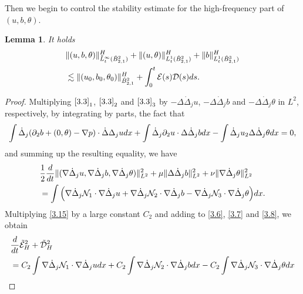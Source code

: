 \documentclass[10pt,a4paper]{amsart}
\numberwithin{equation}{section}
\newtheorem{lemma}[theorem]{Lemma}
\begin{document}
Then we begin to control the stability estimate for the high-frequency part of
$(u,b,\theta)$.

\begin{lemma}\label{lem3.2}
It holds
 \begin{equation}\label{3.14}
\begin{aligned}
&\|(u,b,\theta)\|_{\tilde{L}^\infty_t(\dot{B}^2_{2,1})}^H
 +\|(u,\theta)\|_{{L}^1_t(\dot{B}^2_{2,1})}^H+\|b\|_{{L}^1_t(\dot{B}^3_{2,1})}^H \\
&\lesssim\|(u_0,b_0,\theta_0)\|_{\dot{B}^2_{2,1}}^H
 +\int_0^t\mathcal{E}(s)\mathcal{D}(s){\rm d}s.
\end{aligned}
\end{equation}
\end{lemma}

\begin{proof}
Multiplying $\eqref{3.3}_1$, $\eqref{3.3}_2$ and $\eqref{3.3}_3$ by
$ -\Delta\dot{\Delta}_j u$, $ -\Delta\dot{\Delta}_j b$ and
$ -\Delta\dot{\Delta}_j \theta$ in $L^2$, respectively, by integrating by parts, the fact that
\[
 \int\dot{\Delta}_j(\partial_2b+(0,\theta)-\nabla p)\cdot\dot\Delta{\Delta}_j u{\rm d}x
 +\int\dot{\Delta}_j\partial_2u\cdot\Delta\dot{\Delta}_j b{\rm d}x
 -\int\dot{\Delta}_ju_2\Delta\dot{\Delta}_j\theta{\rm d}x=0,
\]
and summing up the resulting equality, we have
\begin{equation}\label{3.15}
\begin{aligned}
 &\frac{1}{2}\frac{\rm d}{{\rm d}t}\|(\nabla\dot{\Delta}_ju,\nabla\dot{\Delta}_jb,\nabla\dot{\Delta}_j\theta)\|_{L^2}^2+\mu\|\Delta\dot{\Delta}_jb\|_{L^2}^2+\nu\|\nabla\dot{\Delta}_j\theta\|_{L^2}^2 \\
 &=\int\Big(\nabla\dot{\Delta}_j \mathcal{N}_1\cdot\nabla \dot{\Delta}_ju+\nabla
  \dot{\Delta}_j \mathcal{N}_2\cdot \nabla\dot{\Delta}_jb-\nabla\dot{\Delta}_j
  \mathcal{N}_3\cdot \nabla\dot{\Delta}_j\theta\Big){\rm d}x.
\end{aligned}
\end{equation}
Multiplying \eqref{3.15} by a large constant $C_2$ and adding to \eqref{3.6}, \eqref{3.7}
and \eqref{3.8}, we obtain
 \begin{equation}\label{3.16}
\begin{aligned}
&\frac{\rm d}{{\rm d}t}\tilde{\mathcal{E}}_H^2+\tilde{\mathcal{D}}_H^2\\
&= C_2\int\nabla\dot{\Delta}_j \mathcal{N}_1\cdot \nabla\dot{\Delta}_ju{\rm d}x
 +C_2\int\nabla\dot{\Delta}_j \mathcal{N}_2\cdot\nabla \dot{\Delta}_jb{\rm d}x
 -C_2\int\nabla\dot{\Delta}_j \mathcal{N}_3\cdot \nabla\dot{\Delta}_j\theta{\rm d}x \\

\end{aligned}
\end{equation}
\end{proof}
\end{document}

